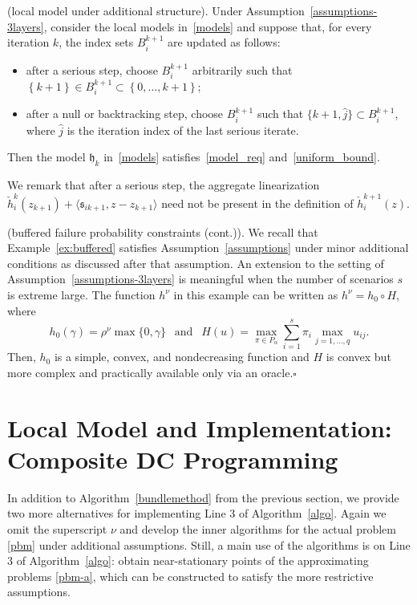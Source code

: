 \documentclass[smallextended,envcountsect]{svjour3}
\newcommand{\col}[1]{\left\{#1\right\}}
\newcommand{\inner}[2]{\langle#1,#2\rangle}
\newcommand{\modelh}{\mathfrak{h}}
\newcommand{\mybox}{{\hfill $\square$}}
\begin{document}
\begin{proposition}{\rm (local model under additional structure).}\label{lem:doublecomposition}
Under Assumption~\ref{assumptions-3layers}, consider the local models in~\eqref{models} and suppose that, for every iteration $k$, the index sets $B_i^{k+1}$ are updated as follows: 
\begin{itemize}
\item after a serious step, choose $B_i^{k+1}$ arbitrarily such that  $\col{k+1} \in B_i^{k+1}  \subset \col{0,\ldots,k+1}$; 

\item after a null or backtracking step, choose $B_i^{k+1}$ such that $\{k+1,  \hat j\} \subset B_i^{k+1}$, where  $\hat j$ is the iteration index of the last serious iterate.
\end{itemize}
Then the model $\modelh_k$ in~\eqref{models} satisfies~\eqref{model_req} and~\eqref{uniform_bound}.
\end{proposition}

We remark that after a serious step,  the aggregate linearization $\check{h}_i^k(z_{k+1}) + \inner{\mathfrak{s}_{ik+1}}{z - z_{k+1} } $ need not be present in the definition of $\check h^{k+1}_i(z)$.

\begin{example}{\rm (buffered failure probability constraints (cont.)).}\label{ex:buffered2}
We recall that Example~\ref{ex:buffered} satisfies Assumption~\ref{assumptions} under minor additional conditions as discussed after that assumption. An extension to the setting of Assumption~\ref{assumptions-3layers} is meaningful when the number of scenarios $s$ is extreme large. The function $h^\nu$ in this example can be written as $h^\nu = h_0 \circ H$, where 
\[
h_0(\gamma) = \rho^\nu\max\{0,\gamma\} ~~\text{ and } ~~ H(u) = \max_{\pi \in P_\alpha}  \sum_{i = 1}^s \pi_i \max_{j=1, \dots, q} u_{ij}.
\]
Then, $h_0$ is a simple, convex, and nondecreasing function and $H$ is convex but more complex and practically available only via an oracle.\mybox
\end{example}



\section{Local Model and Implementation: Composite DC Programming}\label{sec:dc}

In addition to Algorithm~\ref{bundlemethod} from the previous section, we provide two more alternatives for implementing Line 3 of Algorithm~\ref{algo}. Again we omit the superscript $\nu$ and develop the inner algorithms for the actual problem \eqref{pbm} under additional assumptions. Still, a main use of the algorithms is on Line 3 of Algorithm~\ref{algo}: obtain near-stationary points of the approximating problems \eqref{pbm-a}, which can be constructed to satisfy the more restrictive assumptions. 
\end{document}
